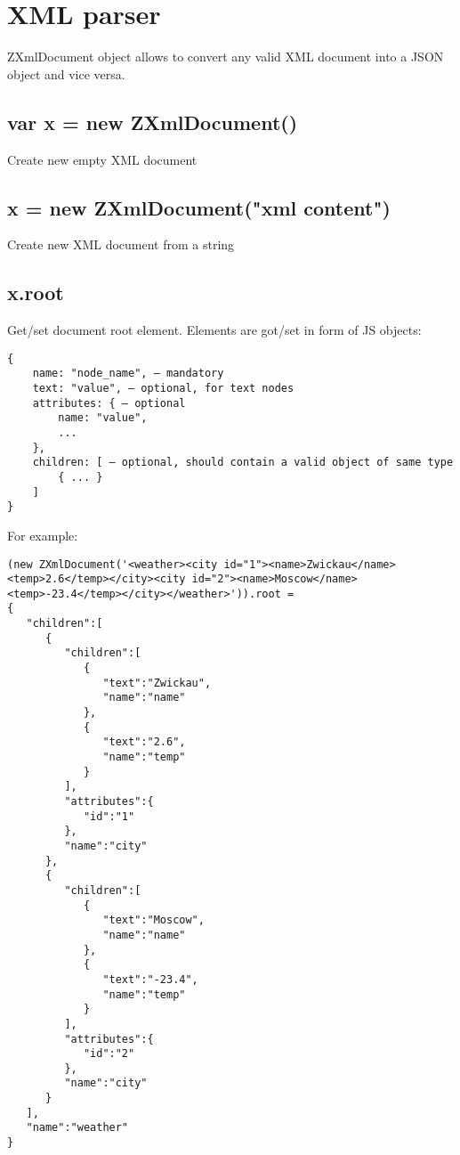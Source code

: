 \section{XML parser}

ZXmlDocument object allows to convert any valid XML document into a JSON object and vice versa.

\subsection{var x = new ZXmlDocument()}
Create new empty XML document

\subsection{x = new ZXmlDocument("xml content")}
Create new XML document from a string

\subsection{x.root}
Get/set document root element. Elements are got/set in form of JS objects:

\begin{lstlisting}
{
    name: "node_name", – mandatory
    text: "value", – optional, for text nodes
    attributes: { – optional
    	name: "value",
    	...
    },
    children: [ – optional, should contain a valid object of same type
    	{ ... }
    ]
}
\end{lstlisting}

For example:
\begin{lstlisting}
(new ZXmlDocument('<weather><city id="1"><name>Zwickau</name><temp>2.6</temp></city><city id="2"><name>Moscow</name><temp>-23.4</temp></city></weather>')).root =
{  
   "children":[  
      {  
         "children":[  
            {  
               "text":"Zwickau",
               "name":"name"
            },
            {  
               "text":"2.6",
               "name":"temp"
            }
         ],
         "attributes":{  
            "id":"1"
         },
         "name":"city"
      },
      {  
         "children":[  
            {  
               "text":"Moscow",
               "name":"name"
            },
            {  
               "text":"-23.4",
               "name":"temp"
            }
         ],
         "attributes":{  
            "id":"2"
         },
         "name":"city"
      }
   ],
   "name":"weather"
}
\end{lstlisting}

